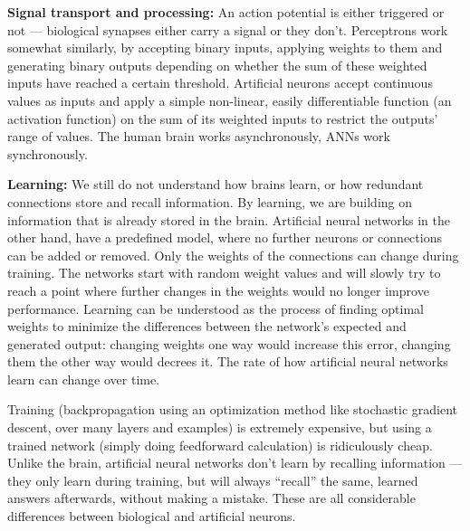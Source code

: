 \textbf{Signal transport and processing:} An action potential is either triggered or not — biological synapses either carry a signal or they don’t. Perceptrons work somewhat similarly, by accepting binary inputs, applying weights to them and generating binary outputs depending on whether the sum of these weighted inputs have reached a certain threshold. Artificial neurons accept continuous values as inputs and apply a simple non-linear, easily differentiable function (an activation function) on the sum of its weighted inputs to restrict the outputs’ range of values. The human brain works asynchronously, ANNs work synchronously.

\textbf{Learning:} We still do not understand how brains learn, or how redundant connections store and recall information. By learning, we are building on information that is already stored in the brain. Artificial neural networks in the other hand, have a predefined model, where no further neurons or connections can be added or removed. Only the weights of the connections can change during training. The networks start with random weight values and will slowly try to reach a point where further changes in the weights would no longer improve performance. Learning can be understood as the process of finding optimal weights to minimize the differences between the network’s expected and generated output: changing weights one way would increase this error, changing them the other way would decrees it. The rate of how artificial neural networks learn can change over time.\par
Training (backpropagation using an optimization method like stochastic gradient descent, over many layers and examples) is extremely expensive, but using a trained network (simply doing feedforward calculation) is ridiculously cheap. Unlike the brain, artificial neural networks don’t learn by recalling information — they only learn during training, but will always “recall” the same, learned answers afterwards, without making a mistake. These are all considerable differences between biological and artificial neurons.


 
